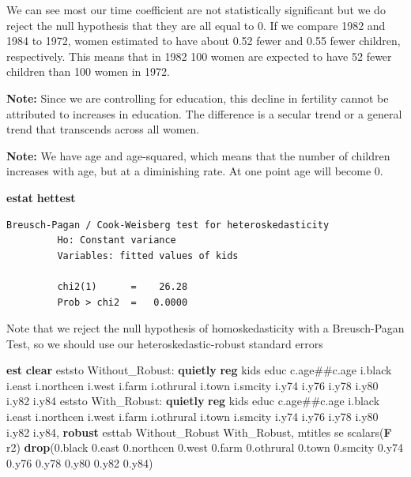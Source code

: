 \documentclass[
]{book}
\newenvironment{Shaded}{\begin{snugshade}}{\end{snugshade}}
\newcommand{\BaseNTok}[1]{\textcolor[rgb]{0.00,0.00,0.81}{#1}}
\newcommand{\FunctionTok}[1]{\textcolor[rgb]{0.13,0.29,0.53}{\textbf{#1}}}
\newcommand{\KeywordTok}[1]{\textcolor[rgb]{0.13,0.29,0.53}{\textbf{#1}}}
\newcommand{\NormalTok}[1]{#1}
\begin{document}
We can see most our time coefficient are not statistically significant but we do reject the null hypothesis that they are all equal to 0. If we compare 1982 and 1984 to 1972, women estimated to have about 0.52 fewer and 0.55 fewer children, respectively. This means that in 1982 100 women are
expected to have 52 fewer children than 100 women in 1972.

\textbf{Note:} Since we are controlling for education, this decline in fertility cannot be attributed to increases in education. The difference is a secular trend or a general trend that transcends across all women.

\textbf{Note:} We have age and age-squared, which means that the number of children increases with age, but at a diminishing rate. At one point age will become 0.

\begin{Shaded}
\begin{Highlighting}[]
\KeywordTok{estat} \KeywordTok{hettest}
\end{Highlighting}
\end{Shaded}

\begin{verbatim}
Breusch-Pagan / Cook-Weisberg test for heteroskedasticity 
         Ho: Constant variance
         Variables: fitted values of kids

         chi2(1)      =    26.28
         Prob > chi2  =   0.0000
\end{verbatim}

Note that we reject the null hypothesis of homoskedasticity with a Breusch-Pagan Test, so we should use our heteroskedastic-robust standard errors

\begin{Shaded}
\begin{Highlighting}[]
\KeywordTok{est} \KeywordTok{clear}
\NormalTok{eststo Without\_Robust: }\KeywordTok{quietly} \KeywordTok{reg}\NormalTok{ kids educ c.age\#\#c.age i.}\BaseNTok{black}\NormalTok{ i.east i.northcen i.west i.farm i.othrural i.town i.smcity i.y74 i.y76 i.y78 i.y80 i.y82 i.y84}
\NormalTok{eststo With\_Robust: }\KeywordTok{quietly} \KeywordTok{reg}\NormalTok{ kids educ c.age\#\#c.age i.}\BaseNTok{black}\NormalTok{ i.east i.northcen i.west i.farm i.othrural i.town i.smcity i.y74 i.y76 i.y78 i.y80 i.y82 i.y84, }\KeywordTok{robust}
\NormalTok{esttab Without\_Robust With\_Robust, mtitles se scalars(}\FunctionTok{F}\NormalTok{ r2) }\KeywordTok{drop}\NormalTok{(0.}\BaseNTok{black}\NormalTok{ 0.east 0.northcen 0.west 0.farm 0.othrural 0.town 0.smcity 0.y74 0.y76 0.y78 0.y80 0.y82 0.y84) }
\end{Highlighting}
\end{Shaded}
\end{document}
